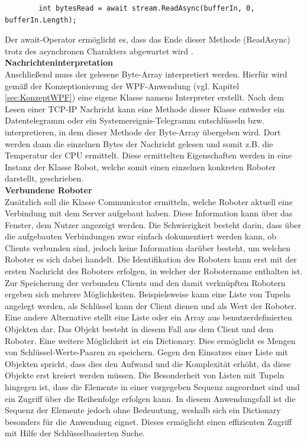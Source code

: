 \documentclass[ a4paper,
                oneside,
                toc=bibliography,
                toc=listof
                ]{scrbook}
\begin{document}
   	\begin{lstlisting}
   		int bytesRead = await stream.ReadAsync(bufferIn, 0, bufferIn.Length);
   	\end{lstlisting}
   	Der await-Operator ermöglicht es, dass das Ende dieser Methode (ReadAsync) trotz des asynchronen Charakters abgewartet wird \cite{kotz2022c}.\\
   	\textbf{Nachrichteninterpretation} \\
    Anschließend muss der gelesene Byte-Array interpretiert werden. Hierfür wird gemäß der Konzeptionierung der WPF-Anwendung (vgl. Kapitel \ref{sec:KonzeptWPF}) eine eigene Klasse namens Interpreter erstellt. Nach dem Lesen einer TCP-IP Nachricht kann eine Methode dieser Klasse entweder ein Datentelegramm oder ein Systemereignis-Telegramm entschlüsseln bzw. interpretieren, in dem dieser Methode der Byte-Array übergeben wird. Dort werden dann die einzelnen Bytes der Nachricht gelesen und somit z.B. die Temperatur der CPU ermittelt. Diese ermittelten Eigenschaften werden in eine Instanz der Klasse Robot, welche somit einen einzelnen konkreten Roboter darstellt, geschrieben.\\
    \textbf{Verbundene Roboter} \\
    Zusätzlich soll die Klasse Communicator ermitteln, welche Roboter aktuell eine Verbindung mit dem Server aufgebaut haben. Diese Information kann über das Fenster, dem Nutzer angezeigt werden. Die Schwierigkeit besteht darin, dass über die aufgebauten Verbindungen zwar einfach dokumentiert werden kann, ob Clients verbunden sind, jedoch keine Information darüber besteht, um welchen Roboter es sich dabei handelt. Die Identifikation des Roboters kann erst mit der ersten Nachricht des Roboters erfolgen, in welcher der Robotername enthalten ist. Zur Speicherung der verbunden Clients und den damit verknüpften Robotern ergeben sich mehrere Möglichkeiten. Beispielsweise kann eine Liste von Tupeln angelegt werden, als Schlüssel kann der Client dienen und als Wert der Roboter. Eine andere Alternative stellt eine Liste oder ein Array aus benutzerdefinierten Objekten dar. Das Objekt besteht in diesem Fall aus dem Client und dem Roboter. Eine weitere Möglichkeit ist ein Dictionary. Dies ermöglicht es Mengen von Schlüssel-Werte-Paaren zu speichern.
    Gegen den Einsatzes einer Liste mit Objekten spricht, dass dies den Aufwand und die Komplexität erhöht, da diese Objekte erst kreiert werden müssen.
    Die Besonderheit von Listen mit Tupeln hingegen ist, dass die Elemente in einer vorgegeben Sequenz angeordnet sind und ein Zugriff über die Reihenfolge erfolgen kann. In diesem Anwendungsfall ist die Sequenz der Elemente jedoch ohne Bedeuutung, weshalb sich ein Dictionary besonders für die Anwendung eignet. Dieses ermöglicht einen effizienten Zugriff mit Hilfe der Schlüsselbasierten Suche. \cite{troelsen2022pro} \cite{kotz2022c}
\end{document}
